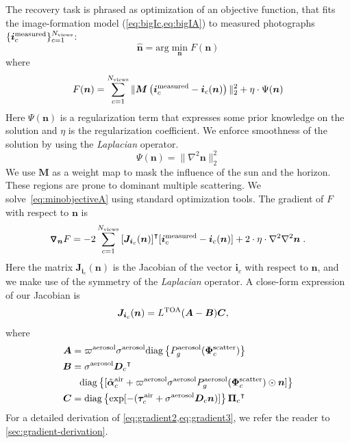\documentclass[10pt,letterpaper]{article}
\newcommand{\Mask}{\bm{M}}
\newcommand{\OpDiag}[1]{\mathrm{diag}\left\{#1\right\}}
\newcommand{\Grad}[1]{\bm{\triangledown_{#1}}}
\newcommand{\argmin}{\mathrm{arg}\min}
\newcommand{\roundy}[1]{\left(#1\right)}
\newcommand{\vect}[1]{\bm{#1}}
\newcommand{\transpose}[1]{{#1}^\intercal}
\begin{document}
The recovery task is phrased as optimization of an objective function,
that fits the image-formation model (\cref{eq:bigIc,eq:bigIA}) to
measured photographs $\{ {\bm i}^{\rm measured}_c\}_{c=1}^{N_{\rm
    views}}$:
\begin{equation}
  \label{eq:minobjectiveA}
  \hat{\bm n} =
  \argmin_{{\bm n}} F({\bm n})
\end{equation}
where
\begin{equation}
  \label{eq:objectiveA}
  F({\bm n})
  = \sum_{c=1}^{N_{\rm views}}
  \| \Mask \roundy{{\bm i}^{\rm measured}_c - {\bm i}_c({\bm n})}\|^2_2 + \eta \cdot \Psi({\bm n})
\end{equation}
Here $\Psi({\bm n})$ is a regularization term that expresses some
prior knowledge on the solution and $\eta$ is the regularization
coefficient.  We enforce smoothness of the solution by using the
\emph{Laplacian} operator.
\begin{equation}
  \label{eq:regularizer}
  \Psi({\bm n}) = \| \nabla^2{\bm n}\|^2_2
\end{equation}
We use $\Mask$ as a weight map to mask the influence of the sun and
the horizon. These regions are prone to dominant multiple scattering.
We solve~\cref{eq:minobjectiveA} using standard optimization tools.
The gradient of $F$ with respect to ${\bm n}$ is
\begin{align}
  \Grad{{\bm n}} F = -2\sum_{c=1}^{N_{\rm views}}
  \transpose{\left[{\bm J}_{{\bm i}_c}({\bm n})\right]} [{\bm i}^{\rm
    measured}_c - {\bm i}_c({\bm n})] + 2 \cdot \eta \cdot
  \nabla^2\nabla^2{\bm n} \;.
  \label{eq:gradient1}
\end{align}
Here the matrix ${\bm J}_{{\bm i}_c}({\bm n})$ is the Jacobian of the
vector ${\bm i}_c$ with respect to ${\bm n}$, and we make use of the
symmetry of the \emph{Laplacian} operator. A close-form expression of
our Jacobian is
\begin{align}
  {\bm J}_{{\bm i}_c}({\bm n}) &= L^{\rm TOA}({\bm A}-{\bm B}){\bm C}
  ,
  \label{eq:gradient2}
\end{align}
where
\begin{align}
  \label{eq:gradient3}
  {\bm A} &= \varpi^{\rm aerosol}\sigma^{\rm aerosol}
  \OpDiag{ P_g^{\rm aerosol}(\vect{\Phi}^{\rm scatter}_c)} \nonumber\\
  {\bm B} &= {\sigma}^{\rm aerosol}\transpose{{\bm D}_c} \nonumber\\
  & \;\;\; \OpDiag{[\tilde{\vect{\alpha}}^{\rm air}_c + \varpi^{\rm
      aerosol}\sigma^{\rm aerosol} P^{\rm aerosol}_g(\vect{\Phi}^{\rm
      scatter}_c) \odot{\bm n}
    ]} \nonumber \\
  {\bm C} &= \OpDiag{\exp[-(\vect{\tau}_c^{\rm air} + {\sigma}^{\rm
      aerosol} {\bm D}_c {\bm n})]} \transpose{{\vect{\Pi}}_c}
\end{align}
For a detailed derivation of \cref{eq:gradient2,eq:gradient3}, we
refer the reader to \cref{sec:gradient-derivation}.
\end{document}
